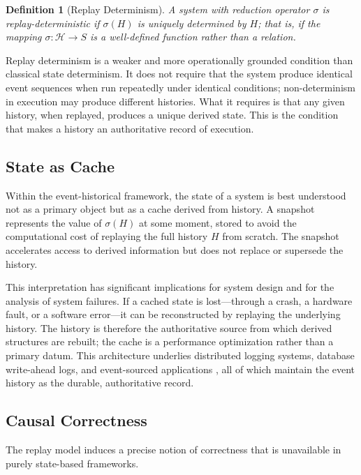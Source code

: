 \documentclass[12pt]{article}
\newtheorem{definition}{Definition}
\begin{document}
\begin{definition}[Replay Determinism]
A system with reduction operator $\sigma$ is \emph{replay-deterministic} if $\sigma(H)$ is uniquely determined by $H$; that is, if the mapping $\sigma : \mathcal{H} \rightarrow S$ is a well-defined function rather than a relation.
\end{definition}

Replay determinism is a weaker and more operationally grounded condition than classical state determinism. It does not require that the system produce identical event sequences when run repeatedly under identical conditions; non-determinism in execution may produce different histories. What it requires is that any given history, when replayed, produces a unique derived state. This is the condition that makes a history an authoritative record of execution.

\subsection{State as Cache}

Within the event-historical framework, the state of a system is best understood not as a primary object but as a cache derived from history. A snapshot represents the value of $\sigma(H)$ at some moment, stored to avoid the computational cost of replaying the full history $H$ from scratch. The snapshot accelerates access to derived information but does not replace or supersede the history.

This interpretation has significant implications for system design and for the analysis of system failures. If a cached state is lost---through a crash, a hardware fault, or a software error---it can be reconstructed by replaying the underlying history. The history is therefore the authoritative source from which derived structures are rebuilt; the cache is a performance optimization rather than a primary datum. This architecture underlies distributed logging systems, database write-ahead logs, and event-sourced applications \cite{fowler2005, kleppmann2017}, all of which maintain the event history as the durable, authoritative record.

\subsection{Causal Correctness}

The replay model induces a precise notion of correctness that is unavailable in purely state-based frameworks.
\end{document}
